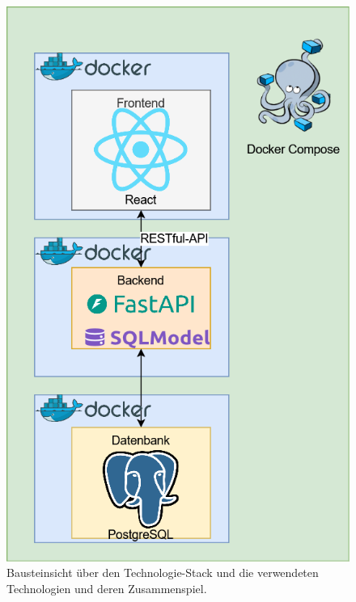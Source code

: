 \documentclass[conference,a4paper]{cs-techrep}
\begin{document}
\begin{figure}
	\centering
	\includegraphics[width=0.9\linewidth]{Bausteinsicht-Architektur.drawio}
	\caption{Bausteinsicht über den Technologie-Stack und die verwendeten Technologien und deren Zusammenspiel.}
	\label{fig:bausteinsicht-architektur}
\end{figure}
\end{document}
